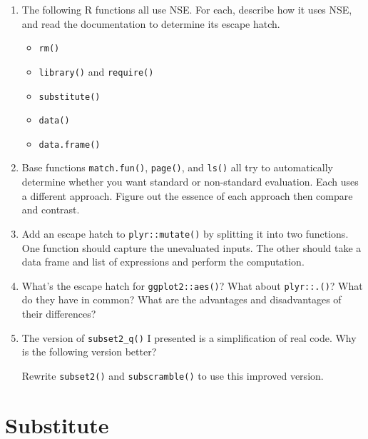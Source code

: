 \begin{enumerate}
\def\labelenumi{\arabic{enumi}.}
\item
  The following R functions all use NSE. For each, describe how it uses
  NSE, and read the documentation to determine its escape hatch.

  \begin{itemize}
  \tightlist
  \item
    \texttt{rm()}
  \item
    \texttt{library()} and \texttt{require()}
  \item
    \texttt{substitute()}
  \item
    \texttt{data()}
  \item
    \texttt{data.frame()}
  \end{itemize}
\item
  Base functions \texttt{match.fun()}, \texttt{page()}, and
  \texttt{ls()} all try to automatically determine whether you want
  standard or non-standard evaluation. Each uses a different approach.
  Figure out the essence of each approach then compare and contrast.
\item
  Add an escape hatch to \texttt{plyr::mutate()} by splitting it into
  two functions. One function should capture the unevaluated inputs. The
  other should take a data frame and list of expressions and perform the
  computation.
\item
  What's the escape hatch for \texttt{ggplot2::aes()}? What about
  \texttt{plyr::.()}? What do they have in common? What are the
  advantages and disadvantages of their differences?
\item
  The version of \texttt{subset2\_q()} I presented is a simplification
  of real code. Why is the following version better?

\begin{Shaded}
\begin{Highlighting}[]
\StringTok{ } \NormalTok{()) \{}
\StringTok{ }
\NormalTok{\}}
\end{Highlighting}
\end{Shaded}

  Rewrite \texttt{subset2()} and \texttt{subscramble()} to use this
  improved version.
\end{enumerate}

\hypertarget{substitute}{%
\section{Substitute}\label{substitute}}

